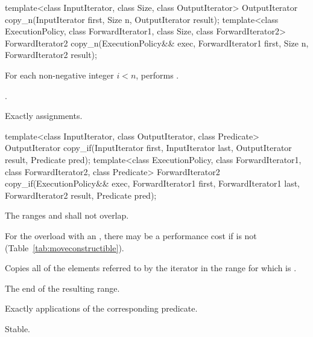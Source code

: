 %
\begin{itemdecl}
template<class InputIterator, class Size, class OutputIterator>
  OutputIterator copy_n(InputIterator first, Size n,
                        OutputIterator result);
template<class ExecutionPolicy, class ForwardIterator1, class Size, class ForwardIterator2>
  ForwardIterator2 copy_n(ExecutionPolicy&& exec,
                          ForwardIterator1 first, Size n,
                          ForwardIterator2 result);
\end{itemdecl}

\begin{itemdescr}
\pnum
\effects For each non-negative integer
$i < n$, performs .

\pnum
\returns {}.

\pnum
\complexity Exactly  assignments.
\end{itemdescr}

%
\begin{itemdecl}
template<class InputIterator, class OutputIterator, class Predicate>
  OutputIterator copy_if(InputIterator first, InputIterator last,
                         OutputIterator result, Predicate pred);
template<class ExecutionPolicy, class ForwardIterator1, class ForwardIterator2, class Predicate>
  ForwardIterator2 copy_if(ExecutionPolicy&& exec,
                           ForwardIterator1 first, ForwardIterator1 last,
                           ForwardIterator2 result, Predicate pred);
\end{itemdecl}

\begin{itemdescr}
\pnum
\requires The ranges  and  shall not overlap.
\begin{note}
For the overload with an , there may be a performance
cost if  is not
 (Table~\ref{tab:moveconstructible}).
\end{note}

\pnum
\effects Copies all of the elements referred to by the iterator  in the range 
for which  is .

\pnum
\returns The end of the resulting range.

\pnum
\complexity Exactly  applications of the corresponding predicate.

\pnum
\remarks Stable.
\end{itemdescr}

